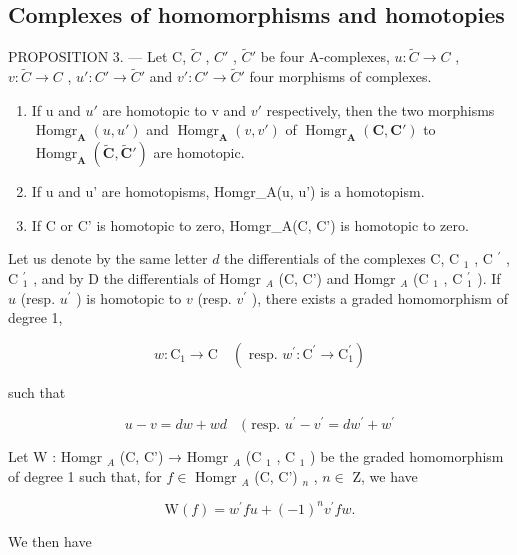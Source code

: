 \subsection{Complexes of homomorphisms and homotopies}

PROPOSITION 3. --- Let C, \(\tilde{C}\) , \(C'\) , \(\tilde{C}'\) be four A-complexes, \(u: \tilde{C} \to C\) , \(v: \tilde{C} \to C\) , \(u': C' \to \tilde{C}'\) and \(v': C' \to \tilde{C}'\) four morphisms of complexes.

\begin{enumerate}
\def\labelenumi{\alph{enumi})}
\item
  If u and \(u'\) are homotopic to v and \(v'\) respectively, then the two morphisms \(\operatorname{Homgr}_{\mathbf{A}}(u, u')\) and \(\operatorname{Homgr}_{\mathbf{A}}(v, v')\) of \(\operatorname{Homgr}_{\mathbf{A}}(\mathbf{C}, \mathbf{C}')\) to \(\operatorname{Homgr}_{\mathbf{A}}(\tilde{\mathbf{C}}, \tilde{\mathbf{C}}')\) are homotopic.
\item
  If u and u' are homotopisms, Homgr\_A(u, u') is a homotopism.
\item
  If C or C' is homotopic to zero, Homgr\_A(C, C') is homotopic to zero.
\end{enumerate}

Let us denote by the same letter \(d\) the differentials of the complexes C, C \(_{1}\) , C \(^{\prime}\) , C \(_{1}^{\prime}\) , and by D the differentials of Homgr \(_{A}\) (C, C') and Homgr \(_{A}\) (C \(_{1}\) , C \(_{1}^{\prime}\) ). If \(u\) (resp. \(u^{\prime}\) ) is homotopic to \(v\) (resp. \(v^{\prime}\) ), there exists a graded homomorphism of degree 1,

\[
w: \mathrm{C} _ {1} \rightarrow \mathrm{C} \quad (\text { resp. } w ^ {\prime}: \mathrm{C} ^ {\prime} \rightarrow \mathrm{C} _ {1} ^ {\prime})
\]

such that

\[
u - v = d w + w d \quad (\text { resp. } u ^ {\prime} - v ^ {\prime} = d w ^ {\prime} + w ^ {\prime}\tag{2}
\]

Let W : Homgr \(_{A}\) (C, C') → Homgr \(_{A}\) (C \(_{1}\) , C \(_{1}\) ) be the graded homomorphism of degree 1 such that, for \(f \in\) Homgr \(_{A}\) (C, C') \(_{n}\) , \(n \in\) Z, we have

\[
\mathrm{W} (f) = w ^ {\prime} f u + (- 1) ^ {n} v ^ {\prime} f w.\tag{3}
\]

We then have


